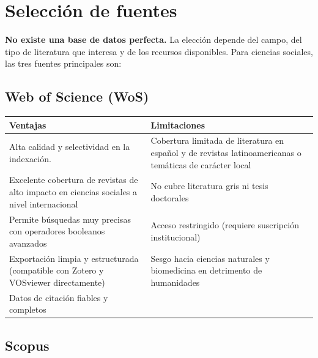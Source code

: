 \documentclass[
]{book}
\newcounter{none} %
\begin{document}
\section{Selección de fuentes}\label{selecciuxf3n-de-fuentes}

\textbf{No existe una base de datos perfecta.} La elección depende del campo, del tipo de literatura que interesa y de los recursos disponibles. Para ciencias sociales, las tres fuentes principales son:

\subsection{Web of Science (WoS)}\label{web-of-science-wos}

{\def\LTcaptype{none} %
\begin{longtable}[]{@{}
  >{\raggedright\arraybackslash}p{}
  >{\raggedright\arraybackslash}p{}@{}}
\toprule\noalign{}
\begin{minipage}[b]{\linewidth}\raggedright
Ventajas
\end{minipage} & \begin{minipage}[b]{\linewidth}\raggedright
Limitaciones
\end{minipage} \\
\midrule\noalign{}
\endhead
\bottomrule\noalign{}
\endlastfoot
Alta calidad y selectividad en la indexación. & Cobertura limitada de literatura en español y de revistas latinoamericanas o temáticas de carácter local \\
Excelente cobertura de revistas de alto impacto en ciencias sociales a nivel internacional & No cubre literatura gris ni tesis doctorales \\
Permite búsquedas muy precisas con operadores booleanos avanzados & Acceso restringido (requiere suscripción institucional) \\
Exportación limpia y estructurada (compatible con Zotero y VOSviewer directamente) & Sesgo hacia ciencias naturales y biomedicina en detrimento de humanidades \\
Datos de citación fiables y completos & \\
\end{longtable}
}

\subsection{Scopus}\label{scopus}
\end{document}
